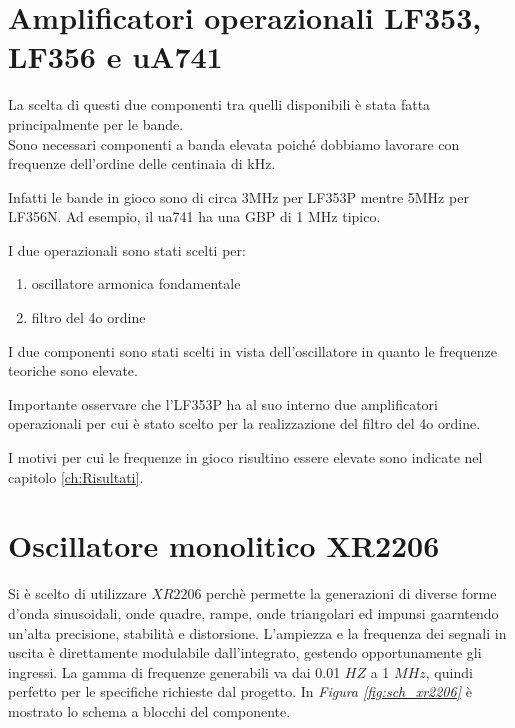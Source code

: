 \documentclass[titlepage]{report}
\begin{document}
	
\section{Amplificatori operazionali LF353, LF356 e uA741}
	La scelta di questi due componenti tra quelli disponibili è stata fatta principalmente per le bande.
	\\ Sono necessari componenti a banda elevata poiché dobbiamo lavorare con frequenze dell'ordine delle centinaia di kHz.
	
	 Infatti le bande in gioco sono di circa 3MHz per LF353P mentre 5MHz per LF356N. Ad esempio, il ua741 ha una GBP di 1 MHz tipico.
	
	I due operazionali sono stati scelti per:
	\begin{enumerate}
		\item oscillatore armonica fondamentale
		\item filtro del 4o ordine 
	\end{enumerate}
	
	\noindent I due componenti sono stati scelti in vista dell'oscillatore in quanto le frequenze teoriche sono elevate.	
	
	\noindent Importante osservare che l'LF353P ha al suo interno due amplificatori operazionali per cui è stato scelto per la realizzazione del filtro del 4o ordine.

	\noindent I motivi per cui le frequenze in gioco risultino essere elevate sono indicate nel capitolo \ref{ch:Risultati}.
	
	
	
\section{Oscillatore monolitico XR2206}
	\label{sec:XR2206}
	
	Si è scelto di utilizzare $XR2206$ perchè permette la generazioni di diverse forme d'onda sinusoidali, onde quadre, rampe, onde triangolari ed impunsi gaarntendo un'alta precisione, stabilità e distorsione. L'ampiezza e la frequenza dei segnali in uscita è direttamente modulabile dall'integrato, gestendo opportunamente gli ingressi. La gamma di frequenze generabili va dai 0.01 $HZ$ a 1 $MHz$, quindi perfetto per le specifiche richieste dal progetto. 
	In \textit{Figura \ref{fig:sch_xr2206}} è mostrato lo schema a blocchi del componente.
	
\end{document}

